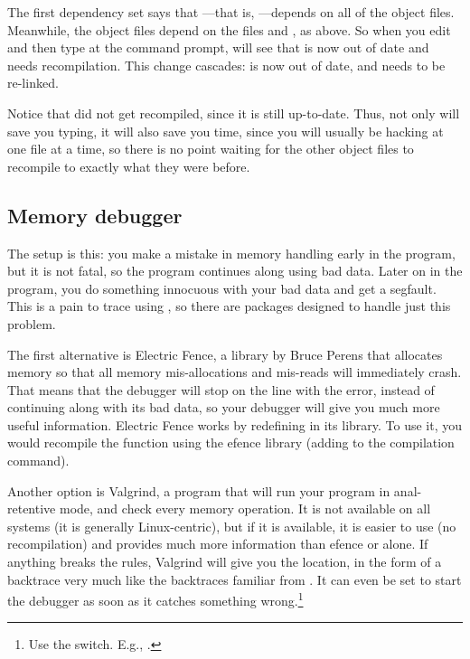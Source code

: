 \documentclass[12pt]{article}
\makeatletter
\def\ind#1{\index{#1}#1}
\def\cind#1{\index{#1@\cinline{#1}}\cinline{#1}}
\makeatother
\begin{document}
The first dependency set says that ---that is, ---depends on all of the object files. Meanwhile, the object files
depend on the  files and , as above. So when
you edit  and then type  at the command prompt,
 will see that  is now out of date and needs
recompilation. This change cascades:  is now out of date,
and needs to be re-linked.

Notice that  did not get recompiled, since it is still
up-to-date. Thus, not only will  save you typing, it will also
save you time, since you will usually be hacking at one file at a time,
so there is no point waiting for the other object files to recompile
to exactly what they were before. 

\subsection{Memory debugger}  

The setup is this: you make a mistake in memory handling early in the
program, but it is not fatal, so the program continues along using bad
data. Later on in the program, you do something innocuous with your bad
data and get a segfault. This is a pain to trace using , so
there are packages designed to handle just this problem.

The first alternative is \ind{Electric Fence}, a
library by Bruce Perens that allocates memory so that all memory
mis-allocations and mis-reads will immediately crash.  That means that
the debugger will stop on the line with the error, instead of continuing
along with its bad data, so your debugger will give you much more useful
information.  Electric Fence works by redefining \cind{malloc} in 
its library. To use it, you would recompile the function
using the efence library (adding  to the compilation
command).


Another option is \ind{Valgrind}, a program that will
run your program in anal-retentive mode, and check every memory operation. 
It is not available on all systems (it is generally Linux-centric), but
if it is available, it is easier to use (no recompilation) and provides much more information than efence or
 alone. If anything breaks the rules, Valgrind will give you
the location, in the form of a backtrace very much like the backtraces
familiar from . It can even be set to start the debugger as soon
as it catches something wrong.\footnote{Use the  switch.
E.g., .}
\end{document}
